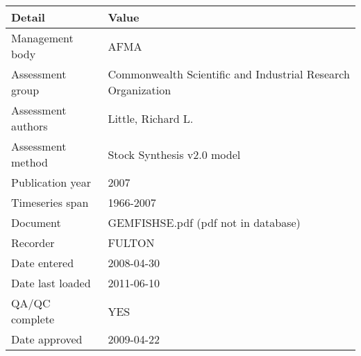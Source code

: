 \begin{table}[htb]
\centering
\begin{tabular}{lp{7cm}}
\toprule
Detail & Value \\
\midrule
Management body    & AFMA                                                         \\
Assessment group   & Commonwealth Scientific and Industrial Research Organization \\
Assessment authors & Little, Richard L.                                           \\
Assessment method  & Stock Synthesis v2.0 model                                   \\
Publication year   & 2007                                                         \\
Timeseries span    & 1966-2007                                                    \\
Document           & GEMFISHSE.pdf (pdf not in database)                          \\
Recorder           & FULTON                                                       \\
Date entered       & 2008-04-30                                                   \\
Date last loaded   & 2011-06-10                                                   \\
QA/QC complete     & YES                                                          \\
Date approved      & 2009-04-22                                                   \\
\bottomrule
\end{tabular}
\label{tab:assessdet}
\end{table}
